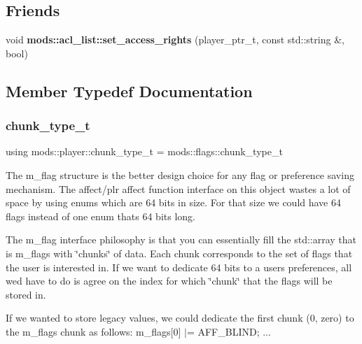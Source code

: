 \subsection*{Friends}
\begin{DoxyCompactItemize}
\item 
\mbox{\label{classmods_1_1player_a670733959fee649b6b7bfbae5ea551a2}} 
void {\bfseries mods\+::acl\+\_\+list\+::set\+\_\+access\+\_\+rights} (player\+\_\+ptr\+\_\+t, const std\+::string \&, bool)
\end{DoxyCompactItemize}


\subsection{Member Typedef Documentation}
\mbox{\label{classmods_1_1player_a98e6f1c1529e3034d1c6e9a48475bc6b}} 
\subsubsection{\texorpdfstring{chunk\+\_\+type\+\_\+t}{chunk\_type\_t}}
{\footnotesize\ttfamily using mods\+::player\+::chunk\+\_\+type\+\_\+t =  mods\+::flags\+::chunk\+\_\+type\+\_\+t}

The m\+\_\+flag structure is the better design choice for any flag or preference saving mechanism. The affect/plr affect function interface on this object wastes a lot of space by using enums which are 64 bits in size. For that size we could have 64 flags instead of one enum that\textquotesingle{}s 64 bits long.

The m\+\_\+flag interface philosophy is that you can essentially fill the std\+::array that is m\+\_\+flags with \char`\"{}chunks\char`\"{} of data. Each chunk corresponds to the set of flags that the user is interested in. If we want to dedicate 64 bits to a user\textquotesingle{}s preferences, all we\textquotesingle{}d have to do is agree on the index for which \char`\"{}chunk\char`\"{} that the flags will be stored in.

If we wanted to store legacy values, we could dedicate the first chunk (0, zero) to the m\+\_\+flags chunk as follows\+: m\+\_\+flags\mbox{[}0\mbox{]} $\vert$= A\+F\+F\+\_\+\+B\+L\+I\+ND; ...

